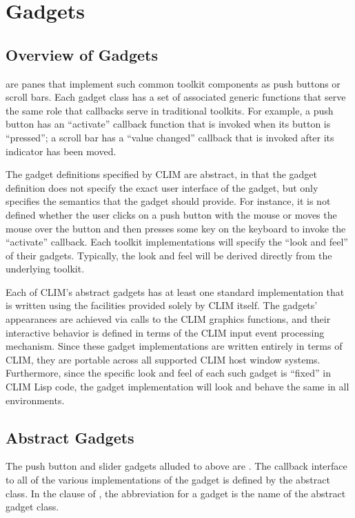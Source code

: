 \chapter {Gadgets}
\label {gadgets}

\section {Overview of Gadgets}

 are panes that implement such common toolkit components as
push buttons or scroll bars.  Each gadget class has a set of associated generic
functions that serve the same role that callbacks serve in traditional toolkits.
For example, a push button has an ``activate'' callback function that is invoked
when its button is ``pressed''; a scroll bar has a ``value changed'' callback
that is invoked after its indicator has been moved.

The gadget definitions specified by CLIM are abstract, in that the gadget
definition does not specify the exact user interface of the gadget, but only
specifies the semantics that the gadget should provide.  For instance, it is not
defined whether the user clicks on a push button with the mouse or moves the
mouse over the button and then presses some key on the keyboard to invoke the
``activate'' callback.  Each toolkit implementations will specify the ``look and
feel'' of their gadgets.  Typically, the look and feel will be derived directly
from the underlying toolkit.

Each of CLIM's abstract gadgets has at least one standard implementation that is
written using the facilities provided solely by CLIM itself.  The gadgets'
appearances are achieved via calls to the CLIM graphics functions, and their
interactive behavior is defined in terms of the CLIM input event processing
mechanism.  Since these gadget implementations are written entirely in terms of
CLIM, they are portable across all supported CLIM host window systems.
Furthermore, since the specific look and feel of each such gadget is ``fixed''
in CLIM Lisp code, the gadget implementation will look and behave the same in
all environments.


\section {Abstract Gadgets}

The push button and slider gadgets alluded to above are .  The callback interface to all of the various implementations of the
gadget is defined by the abstract class.  In the  clause of
, the abbreviation for a gadget is the name of the
abstract gadget class.

